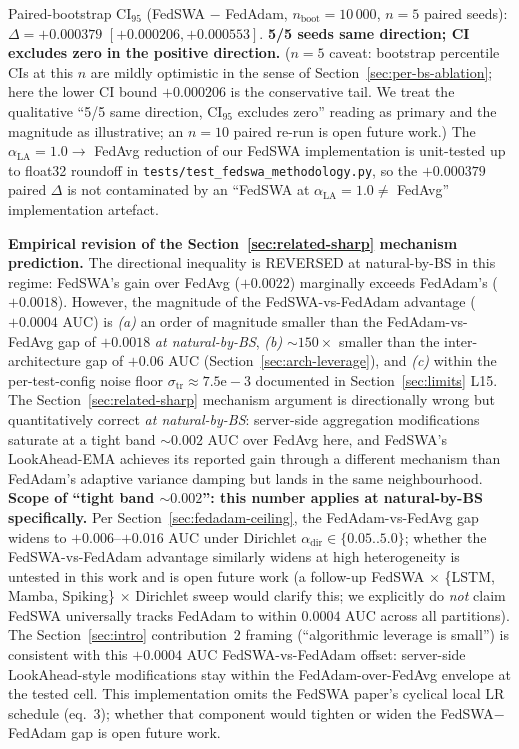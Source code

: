\documentclass[journal]{IEEEtran}
\newcommand{\alphadir}{\ensuremath{\alpha_{\mathrm{dir}}}}
\newcommand{\alphala}{\ensuremath{\alpha_{\mathrm{LA}}}}
\begin{document}
Paired-bootstrap CI$_{95}$ (FedSWA $-$ FedAdam, $n_{\mathrm{boot}}=10\,000$, $n=5$ paired seeds): $\Delta = \mathbf{+0.000379}$ $[+0.000206, +0.000553]$. \textbf{5/5 seeds same direction; CI excludes zero in the positive direction.} ($n=5$ caveat: bootstrap percentile CIs at this $n$ are mildly optimistic in the sense of Section~\ref{sec:per-bs-ablation}; here the lower CI bound $+0.000206$ is the conservative tail. We treat the qualitative ``5/5 same direction, CI$_{95}$ excludes zero'' reading as primary and the magnitude as illustrative; an $n=10$ paired re-run is open future work.) The $\alphala = 1.0 \rightarrow$ FedAvg reduction of our FedSWA implementation is unit-tested up to float32 roundoff in \lstinline|tests/test_fedswa_methodology.py|, so the $+0.000379$ paired $\Delta$ is not contaminated by an ``FedSWA at $\alphala=1.0 \neq$ FedAvg'' implementation artefact.

\textbf{Empirical revision of the Section~\ref{sec:related-sharp} mechanism prediction.} The directional inequality is REVERSED at natural-by-BS in this regime: FedSWA's gain over FedAvg ($+0.0022$) marginally exceeds FedAdam's ($+0.0018$). However, the magnitude of the FedSWA-vs-FedAdam advantage ($+0.0004$ AUC) is \emph{(a)} an order of magnitude smaller than the FedAdam-vs-FedAvg gap of $+0.0018$ \emph{at natural-by-BS}, \emph{(b)} $\sim 150\times$ smaller than the inter-architecture gap of $+0.06$ AUC (Section~\ref{sec:arch-leverage}), and \emph{(c)} within the per-test-config noise floor $\sigma_{\mathrm{tr}} \approx 7.5\mathrm{e}{-}3$ documented in Section~\ref{sec:limits} L15. The Section~\ref{sec:related-sharp} mechanism argument is directionally wrong but quantitatively correct \emph{at natural-by-BS}: server-side aggregation modifications saturate at a tight band $\sim 0.002$ AUC over FedAvg here, and FedSWA's LookAhead-EMA achieves its reported gain through a different mechanism than FedAdam's adaptive variance damping but lands in the same neighbourhood. \textbf{Scope of ``tight band $\sim 0.002$'': this number applies at natural-by-BS specifically.} Per Section~\ref{sec:fedadam-ceiling}, the FedAdam-vs-FedAvg gap widens to $+0.006$--$+0.016$ AUC under Dirichlet $\alphadir \in \{0.05..5.0\}$; whether the FedSWA-vs-FedAdam advantage similarly widens at high heterogeneity is untested in this work and is open future work (a follow-up FedSWA $\times$ \{LSTM, Mamba, Spiking\} $\times$ Dirichlet sweep would clarify this; we explicitly do \emph{not} claim FedSWA universally tracks FedAdam to within $0.0004$ AUC across all partitions). The Section~\ref{sec:intro} contribution~2 framing (``algorithmic leverage is small'') is consistent with this $+0.0004$ AUC FedSWA-vs-FedAdam offset: server-side LookAhead-style modifications stay within the FedAdam-over-FedAvg envelope at the tested cell. This implementation omits the FedSWA paper's cyclical local LR schedule (eq.~3); whether that component would tighten or widen the FedSWA$-$FedAdam gap is open future work.
\end{document}
